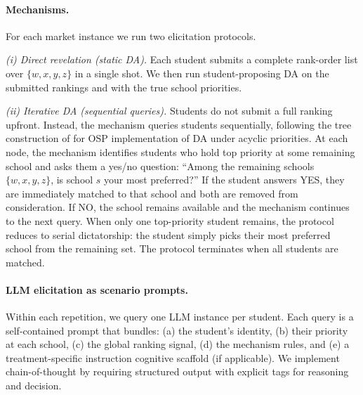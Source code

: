 \documentclass[format=acmsmall, review=false]{acmart}
\begin{document}
\paragraph{Mechanisms.}
For each market instance we run two elicitation protocols.

\emph{(i) Direct revelation (static DA).} Each student submits a complete rank-order list over $\{w,x,y,z\}$ in a single shot. We then run student-proposing DA on the submitted rankings and with the true school priorities.

\emph{(ii) Iterative DA (sequential queries).} Students do not submit a full ranking upfront. Instead, the mechanism queries students sequentially, following the tree construction of \citet{ashlagi2018stable} for OSP implementation of DA under acyclic priorities. At each node, the mechanism identifies students who hold top priority at some remaining school and asks them a yes/no question: ``Among the remaining schools $\{w, x, y, z\}$, is school $s$ your most preferred?'' If the student answers YES, they are immediately matched to that school and both are removed from consideration. If NO, the school remains available and the mechanism continues to the next query. When only one top-priority student remains, the protocol reduces to serial dictatorship: the student simply picks their most preferred school from the remaining set. The protocol terminates when all students are matched.

\paragraph{LLM elicitation as scenario prompts.}
Within each repetition, we query one LLM instance per student. Each query is a self-contained prompt that bundles: (a) the student's identity,  (b) their priority  at each school, (c) the global ranking signal, (d) the mechanism rules, and (e) a treatment-specific instruction cognitive scaffold (if applicable). We implement chain-of-thought \citep{wei2022chain} by requiring structured output with explicit tags for reasoning and decision.
\end{document}
